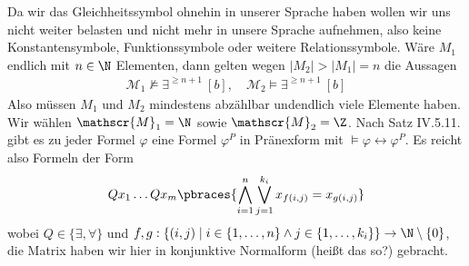 \begin{solution}
	Da wir das Gleichheitssymbol ohnehin in unserer Sprache haben wollen wir uns nicht weiter belasten und nicht mehr in unsere Sprache aufnehmen, also keine Konstantensymbole, Funktionssymbole oder weitere Relationssymbole. Wäre $M_1$ endlich mit $n \in \N$ Elementen, dann gelten wegen $ |M_2| > |M_1| = n$ die Aussagen
	\begin{align*}
	\mathscr{M}_1 \nvDash \exists^{\geq n + 1} \ [b], \quad \mathscr{M}_2 \vDash \exists^{\geq n + 1} \ [b]
	\end{align*} 
	 Also müssen $M_1$ und $M_2$ mindestens abzählbar undendlich viele Elemente haben. Wir wählen $\mathscr{M}_1 = \N$ sowie $\mathscr{M}_2 = \Z$. Nach Satz IV.5.11. gibt es zu jeder Formel $\varphi$ eine Formel $\varphi^P$ in Pränexform mit $\vDash \varphi \leftrightarrow \varphi^P$. Es reicht also Formeln der Form 
	 \begin{align*}
	 Qx_1 \dots Qx_m \pbraces{\bigwedge_{i = 1}^n \bigvee_{j = 1}^{k_i} x_{f(i,j)} = x_{g(i,j)} }
	 \end{align*}
	 wobei $Q \in \{\exists, \forall\}$ und $f,g: \{(i,j) \mid i \in \{1, \dots, n\} \land j \in \{1, \dots, k_i\}\} \to \N \setminus\{0\}$, die Matrix haben wir hier in konjunktive Normalform (heißt das so?) gebracht. 
\end{solution}
